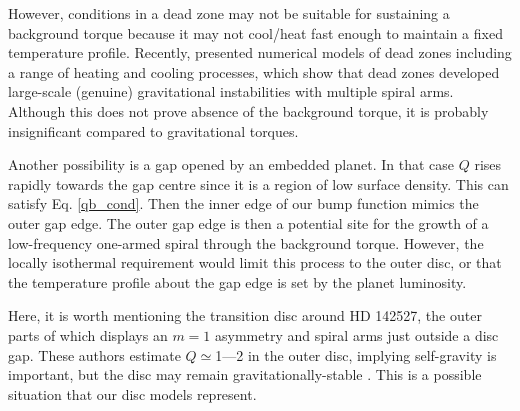 {  However, conditions in a dead zone may not be suitable for 
  sustaining a background torque because it may not cool/heat fast enough
  to maintain a fixed temperature profile. Recently, 
  \cite{bae14} presented numerical models of
  dead zones including a range of heating and 
  cooling processes, which show that dead zones developed large-scale
  (genuine) gravitational instabilities with multiple spiral
  arms. Although this does not prove absence of the background torque,
  it is probably insignificant compared to gravitational torques. 

  Another possibility is a gap opened by an embedded planet. In that case $Q$
  rises rapidly towards the gap centre since it is a region of low
  surface density. This can satisfy Eq. \ref{qb_cond}. Then the inner
  edge of our bump function mimics the outer gap edge. The outer gap
  edge is then a potential site for the growth of a low-frequency
  one-armed spiral through the background torque. However, the
  locally isothermal requirement would limit this process to the
  outer disc, or that the temperature 
  profile about the gap edge is set by the planet luminosity.  

  Here, it is worth mentioning the transition disc 
  around HD 142527, the outer parts of which displays an $m=1$
  asymmetry \citep{fukagawa13} and spiral arms 
  \citep{christiaens14} just outside a disc gap. These authors estimate 
  $Q\simeq$1---2 in the outer disc, implying self-gravity is
  important, but the disc may remain gravitationally-stable
  \citep{christiaens14}. This is a  
  possible situation that our disc models represent. 
}


